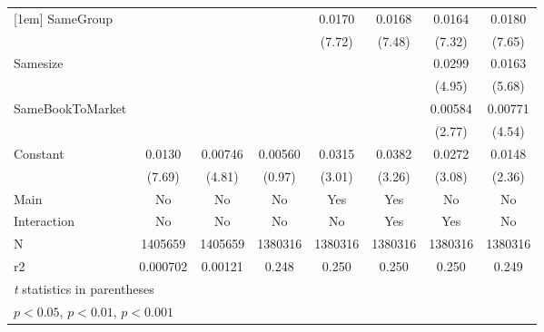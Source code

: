 {\begin{tabular}{l*{7}{c}}
[1em]
SameGroup           &                     &                     &                     &      0.0170\sym{***}&      0.0168\sym{***}&      0.0164\sym{***}&      0.0180\sym{***}\\
                    &                     &                     &                     &      (7.72)         &      (7.48)         &      (7.32)         &      (7.65)         \\
[1em]
Samesize            &                     &                     &                     &                     &                     &      0.0299\sym{***}&      0.0163\sym{***}\\
                    &                     &                     &                     &                     &                     &      (4.95)         &      (5.68)         \\
[1em]
SameBookToMarket    &                     &                     &                     &                     &                     &     0.00584\sym{**} &     0.00771\sym{***}\\
                    &                     &                     &                     &                     &                     &      (2.77)         &      (4.54)         \\
[1em]
Constant            &      0.0130\sym{***}&     0.00746\sym{***}&     0.00560         &      0.0315\sym{**} &      0.0382\sym{**} &      0.0272\sym{**} &      0.0148\sym{*}  \\
                    &      (7.69)         &      (4.81)         &      (0.97)         &      (3.01)         &      (3.26)         &      (3.08)         &      (2.36)         \\
\hline
Main                &          No         &          No         &          No         &         Yes         &         Yes         &          No         &          No         \\
Interaction         &          No         &          No         &          No         &          No         &         Yes         &         Yes         &          No         \\
N                   &     1405659         &     1405659         &     1380316         &     1380316         &     1380316         &     1380316         &     1380316         \\
r2                  &    0.000702         &     0.00121         &       0.248         &       0.250         &       0.250         &       0.250         &       0.249         \\
\hline\hline
\multicolumn{8}{l}{\footnotesize \textit{t} statistics in parentheses}\\
\multicolumn{8}{l}{\footnotesize \sym{*} \(p<0.05\), \sym{**} \(p<0.01\), \sym{***} \(p<0.001\)}\\
\end{tabular}
}
